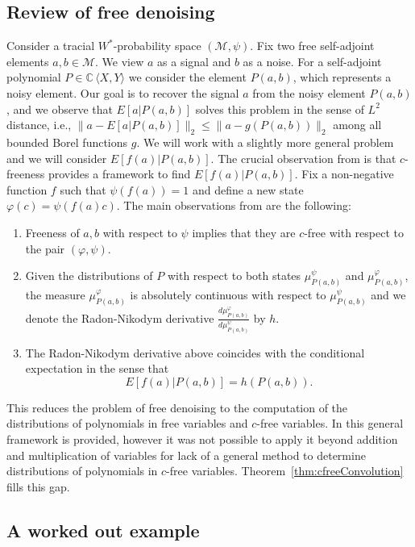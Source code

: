 \documentclass[12pt]{amsart}
\def\E{E}
\theoremstyle{definition}
\numberwithin{equation}{section}
\begin{document}
\subsection{Review of free denoising}
Consider a tracial $W^*$-probability space $(\mathcal{M},\psi)$. Fix two free
self-adjoint elements $a,b\in \mathcal{M}$. We view $a$ as a signal and $b$ as
a noise. For a self-adjoint polynomial $P\in\mathbb{C}\,\langle X,Y\rangle$ we
consider the element $P(a,b)$, which represents a noisy element. Our goal is to
recover the signal $a$ from the noisy element $P(a,b)$, and we observe that
$\E[a|P(a,b)]$ solves this problem in the sense of $L^2$ distance, i.e.,
$\lVert a-\E[a|P(a,b)]\rVert_2\leq \lVert a-g(P(a,b))\rVert_2$ among all bounded
Borel functions $g$. We will work with a slightly more general problem and we
will consider $\E[f(a)|P(a,b)]$. The crucial observation from \cite{FevrierNicaSzpojankowski:2024} is that $c$-freeness provides a framework to find $\E[f(a)|P(a,b)]$. Fix a non-negative function $f$ such that $\psi(f(a))=1$ and define a new state $\varphi(c)=\psi(f(a)c)$. The main observations from \cite{FevrierNicaSzpojankowski:2024} are the following:
\begin{enumerate}[label=\arabic*.]
 \item Freeness of $a,b$ with respect to $\psi$ implies that they are $c$-free with respect to the pair $(\varphi,\psi)$.
 \item Given the distributions of $P$ with respect to both states
  $\mu_{P(a,b)}^{\psi}$ and $\mu_{P(a,b)}^{\varphi}$, the measure
  $\mu_{P(a,b)}^{\varphi}$ is absolutely continuous with respect to
  $\mu_{P(a,b)}^{\psi}$ and we denote  the Radon-Nikodym
  derivative  $\tfrac{d \mu_{P(a,b)}^{\varphi}}{d \mu_{P(a,b)}^{\psi}}$  by $h$. 
 \item The Radon-Nikodym derivative above coincides with the conditional
  expectation
  in the sense that
  \[
    \E[f(a)|P(a,b)]=h(P(a,b)).
  \]
\end{enumerate}
This reduces the problem of free denoising to the computation of the
distributions of
polynomials in
free variables and $c$-free variables. In \cite{FevrierNicaSzpojankowski:2024}
this general framework is provided, however it was not possible to apply it
beyond addition and multiplication of variables for lack of a general
method to determine distributions of polynomials in $c$-free
variables. Theorem~\ref{thm:cfreeConvolution} fills this gap.
		
		
\subsection{A worked out example}
\end{document}
